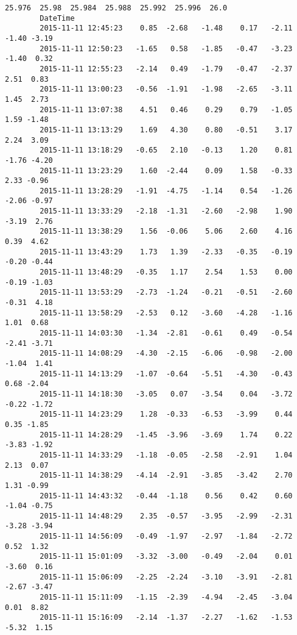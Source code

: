\documentclass[a4paper,dvipdfmx]{jsarticle}
\begin{document}
\begin{Verbatim}[commandchars=\\\{\}]
                             25.976  25.98  25.984  25.988  25.992  25.996  26.0  
        DateTime                                                                  
        2015-11-11 12:45:23    0.85  -2.68   -1.48    0.17   -2.11   -1.40 -3.19  
        2015-11-11 12:50:23   -1.65   0.58   -1.85   -0.47   -3.23   -1.40  0.32  
        2015-11-11 12:55:23   -2.14   0.49   -1.79   -0.47   -2.37    2.51  0.83  
        2015-11-11 13:00:23   -0.56  -1.91   -1.98   -2.65   -3.11    1.45  2.73  
        2015-11-11 13:07:38    4.51   0.46    0.29    0.79   -1.05    1.59 -1.48  
        2015-11-11 13:13:29    1.69   4.30    0.80   -0.51    3.17    2.24  3.09  
        2015-11-11 13:18:29   -0.65   2.10   -0.13    1.20    0.81   -1.76 -4.20  
        2015-11-11 13:23:29    1.60  -2.44    0.09    1.58   -0.33    2.33 -0.96  
        2015-11-11 13:28:29   -1.91  -4.75   -1.14    0.54   -1.26   -2.06 -0.97  
        2015-11-11 13:33:29   -2.18  -1.31   -2.60   -2.98    1.90   -3.19  2.76  
        2015-11-11 13:38:29    1.56  -0.06    5.06    2.60    4.16    0.39  4.62  
        2015-11-11 13:43:29    1.73   1.39   -2.33   -0.35   -0.19   -0.20 -0.44  
        2015-11-11 13:48:29   -0.35   1.17    2.54    1.53    0.00   -0.19 -1.03  
        2015-11-11 13:53:29   -2.73  -1.24   -0.21   -0.51   -2.60   -0.31  4.18  
        2015-11-11 13:58:29   -2.53   0.12   -3.60   -4.28   -1.16    1.01  0.68  
        2015-11-11 14:03:30   -1.34  -2.81   -0.61    0.49   -0.54   -2.41 -3.71  
        2015-11-11 14:08:29   -4.30  -2.15   -6.06   -0.98   -2.00   -1.04  1.41  
        2015-11-11 14:13:29   -1.07  -0.64   -5.51   -4.30   -0.43    0.68 -2.04  
        2015-11-11 14:18:30   -3.05   0.07   -3.54    0.04   -3.72   -0.22 -1.72  
        2015-11-11 14:23:29    1.28  -0.33   -6.53   -3.99    0.44    0.35 -1.85  
        2015-11-11 14:28:29   -1.45  -3.96   -3.69    1.74    0.22   -3.83 -1.92  
        2015-11-11 14:33:29   -1.18  -0.05   -2.58   -2.91    1.04    2.13  0.07  
        2015-11-11 14:38:29   -4.14  -2.91   -3.85   -3.42    2.70    1.31 -0.99  
        2015-11-11 14:43:32   -0.44  -1.18    0.56    0.42    0.60   -1.04 -0.75  
        2015-11-11 14:48:29    2.35  -0.57   -3.95   -2.99   -2.31   -3.28 -3.94  
        2015-11-11 14:56:09   -0.49  -1.97   -2.97   -1.84   -2.72    0.52  1.32  
        2015-11-11 15:01:09   -3.32  -3.00   -0.49   -2.04    0.01   -3.60  0.16  
        2015-11-11 15:06:09   -2.25  -2.24   -3.10   -3.91   -2.81   -2.67 -3.47  
        2015-11-11 15:11:09   -1.15  -2.39   -4.94   -2.45   -3.04    0.01  8.82  
        2015-11-11 15:16:09   -2.14  -1.37   -2.27   -1.62   -1.53   -5.32  1.15  

\end{Verbatim}
\end{document}
